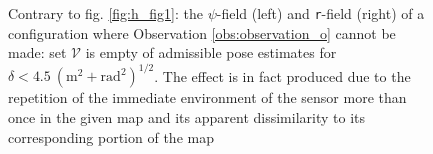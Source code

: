 \begin{figure}
  
  \vspace{0.7cm}
  \caption{\small Contrary to fig. \ref{fig:h_fig1}: the $\psi$-field (left)
           and \texttt{r}-field (right) of a configuration where Observation
           \ref{obs:observation_o} cannot be made: set $\mathcal{V}$ is
           empty of admissible pose estimates for $\delta < 4.5 \ (\text{m}^2 + \text{rad}^2)^{1/2}$.
           The effect is in fact produced due to the repetition of the
           immediate environment of the sensor more than once in the given map
           and its apparent dissimilarity to its corresponding portion of the
           map}
  \label{fig:h_not_fig1}
\end{figure}
